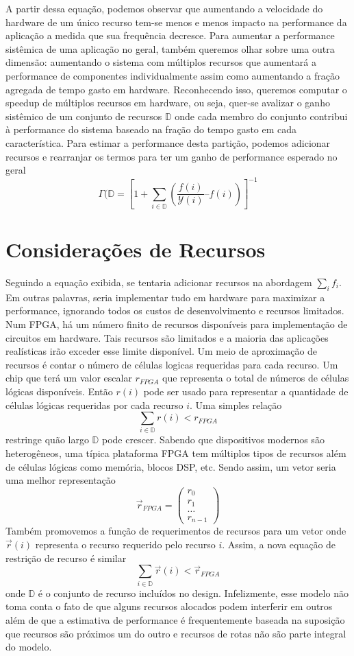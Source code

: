 A partir dessa equação, podemos observar que aumentando a velocidade do hardware de um único recurso tem-se menos e menos impacto na performance da aplicação a medida que sua frequência decresce. Para aumentar a performance sistêmica de uma aplicação no geral, também queremos olhar sobre uma outra dimensão: aumentando o sistema com múltiplos recursos que aumentará a performance de componentes individualmente assim como aumentando a fração agregada de tempo gasto em hardware. Reconhecendo isso, queremos computar o speedup de múltiplos recursos em hardware, ou seja, quer-se avalizar o ganho sistêmico de um conjunto de recursos $ \mathbb{D} $ onde cada membro do conjunto contribui à performance do sistema baseado na fração do tempo gasto em cada característica. Para estimar a performance desta partição, podemos adicionar recursos e rearranjar os termos para ter um ganho de performance esperado no geral
$$ \Gamma (\mathbb{D} = \left [ 1 + \sum _{i \in \mathbb{D}} (\frac{f(i)}{\mathcal{Y}(i)} – f(i)) \right ]^{-1} $$



\section{Considerações de Recursos}
Seguindo a equação exibida, se tentaria adicionar recursos na abordagem $\sum_i f_i$. Em outras palavras, seria implementar tudo em hardware para maximizar a performance, ignorando todos os custos de desenvolvimento e recursos limitados. Num FPGA, há um número finito de recursos disponíveis para implementação de circuitos em hardware. Tais recursos são limitados e a maioria das aplicações realísticas irão exceder esse limite disponível. Um meio de aproximação de recursos é contar o número de células logicas requeridas para cada recurso. Um chip que terá um valor escalar $ r_{FPGA} $ que representa o total de números de células lógicas disponíveis. Então $ r(i) $ pode ser usado para representar a quantidade de células lógicas requeridas por cada recurso $ i $. Uma simples relação 
$$ \sum_{i \in \mathbb{D}} r(i) < r_{FPGA} $$
restringe quão largo $ \mathbb{D} $ pode crescer.
Sabendo que dispositivos modernos são heterogêneos, uma típica plataforma FPGA tem múltiplos tipos de recursos além de células lógicas como memória, blocos DSP, etc. Sendo assim, um vetor seria uma melhor representação
$$ 
\vec{r}_{FPGA} =
\begin{pmatrix}
r_0\\ 
r_1\\ 
\dots \\
r_{n-1}
\end{pmatrix}
$$
Também promovemos a função de requerimentos de recursos para um vetor onde $ \vec{r}(i) $ representa o recurso requerido pelo recurso $ i $. Assim, a nova equação de restrição de recurso é similar 
$$ \sum_{i \in \mathbb{D}} \vec{r}(i) < \vec{r}_{FPGA} $$
onde $ \mathbb{D} $ é o conjunto de recurso incluídos no design.
Infelizmente, esse modelo não toma conta o fato de que alguns recursos alocados podem interferir em outros além de que a estimativa de performance é frequentemente baseada na suposição que recursos são próximos um do outro e recursos de rotas não são parte integral do modelo.


